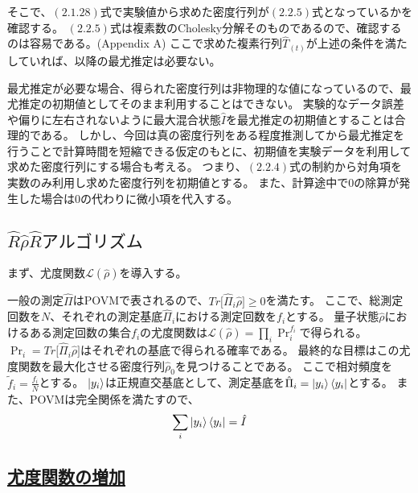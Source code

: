 \documentclass[11pt,a4j,notitlepage]{jreport}
\begin{document}
	そこで、$(2.1.28)$式で実験値から求めた密度行列が$(2.2.5)$式となっているかを確認する。
	$(2.2.5)$式は複素数のCholesky分解そのものであるので、確認するのは容易である。(Appendix A)
	ここで求めた複素行列$\hat{T}_{(t)}$が上述の条件を満たしていれば、以降の最尤推定は必要ない。

	最尤推定が必要な場合、得られた密度行列は非物理的な値になっているので、最尤推定の初期値としてそのまま利用することはできない。
	実験的なデータ誤差や偏りに左右されないように最大混合状態$\hat{I}$を最尤推定の初期値とすることは合理的である。
	しかし、今回は真の密度行列をある程度推測してから最尤推定を行うことで計算時間を短縮できる仮定のもとに、初期値を実験データを利用して求めた密度行列にする場合も考える。
	つまり、$(2.2.4)$式の制約から対角項を実数のみ利用し求めた密度行列を初期値とする。
	また、計算途中で0の除算が発生した場合は0の代わりに微小項を代入する。

	\subsection{$\hat{R}\hat{\rho}\hat{R}アルゴリズム$}

	まず、尤度関数$\mathcal{L} (\hat{\rho})$を導入する。

	一般の測定$\hat{\Pi}$はPOVMで表されるので、$Tr \big[ \hat{\Pi}_i \hat{\rho} \big] \geq 0$を満たす。
	ここで、総測定回数を$N$、それぞれの測定基底$\hat{\Pi}_i$における測定回数を$f_i$とする。
	量子状態$\hat{\rho}$におけるある測定回数の集合{$f_i$}の尤度関数は$\mathcal{L} (\hat{\rho}) = \prod_i \Pr_i^{f_i}$で得られる。
	$\Pr_i = Tr \big[ \hat{\Pi}_i \hat{\rho} \big]$はそれぞれの基底で得られる確率である。
	最終的な目標はこの尤度関数を最大化させる密度行列$\hat{\rho}_0$を見つけることである。
	ここで相対頻度を$\tilde{f}_i = \frac{f_i}{N}$とする。
	$\ket{y_i}$は正規直交基底として、測定基底を$\hat{\Pi}_i = \ket{y_i} \bra{y_i}$とする。
	また、POVMは完全関係を満たすので、
	\begin{equation}
		\sum_i \ket{y_i} \bra{y_i} = \hat{I}
	\end{equation}

	\subsection*{\underline{尤度関数の増加}}
\end{document}
